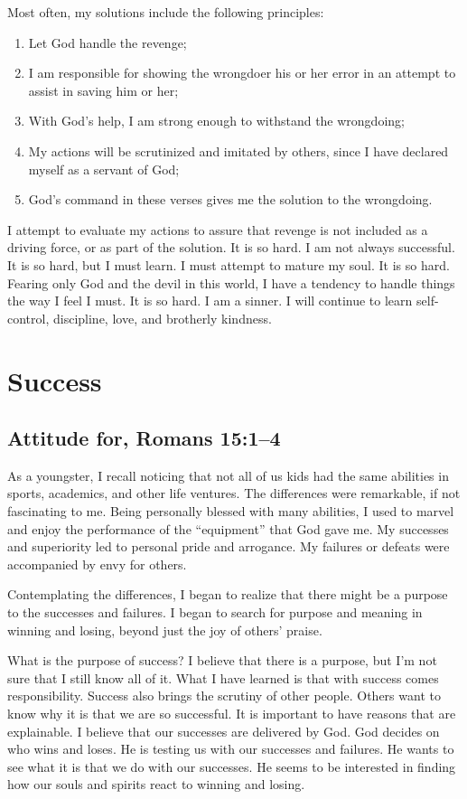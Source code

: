 \documentclass[12pt]{memoir}
\begin{document}
Most often, my solutions include the following principles:
\begin{enumerate}
\item Let God handle the revenge; 
\item I am responsible for showing the wrongdoer his or her error in an
attempt to assist in saving him or her; 
\item With God's help, I am strong enough to withstand the wrongdoing; 
\item My actions will be scrutinized and imitated by others, since I have
declared myself as a servant of God; 
\item God's command in these verses gives me the solution to the wrongdoing.
\end{enumerate}
I attempt to evaluate my actions to assure that revenge is not included
as a driving force, or as part of the solution. It is so hard. I am
not always successful. It is so hard, but I must learn. I must attempt
to mature my soul. It is so hard. Fearing only God and the devil in
this world, I have a tendency to handle things the way I feel I must.
It is so hard. I am a sinner. I will continue to learn self-control,
discipline, love, and brotherly kindness.

\section{Success}

\subsection{Attitude for, Romans 15:1--4}

As a youngster, I recall noticing that not all of us kids had the
same abilities in sports, academics, and other life ventures. The
differences were remarkable, if not fascinating to me. Being personally
blessed with many abilities, I used to marvel and enjoy the performance
of the ``equipment'' that God gave me. My successes and superiority
led to personal pride and arrogance. My failures or defeats were accompanied
by envy for others.

Contemplating the differences, I began to realize that there might
be a purpose to the successes and failures. I began to search for
purpose and meaning in winning and losing, beyond just the joy of
others' praise.

What is the purpose of success? I believe that there is a purpose,
but I'm not sure that I still know all of it. What I have learned
is that with success comes responsibility. Success also brings the
scrutiny of other people. Others want to know why it is that we are
so successful. It is important to have reasons that are explainable.
I believe that our successes are delivered by God. God decides on
who wins and loses. He is testing us with our successes and failures.
He wants to see what it is that we do with our successes. He seems
to be interested in finding how our souls and spirits react to winning
and losing.
\end{document}
